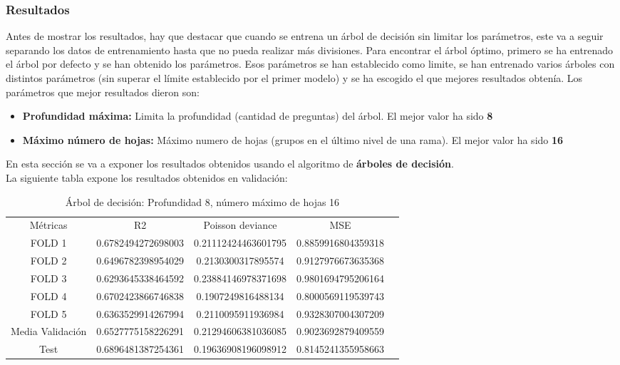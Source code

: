 \subsubsection{Resultados}
\label{sec:res_tree}
Antes de mostrar los resultados, hay que destacar que cuando se entrena un árbol de decisión sin limitar los parámetros, este va a seguir separando los datos de entrenamiento hasta que no pueda realizar más divisiones. Para encontrar el árbol óptimo, primero se ha entrenado el árbol por defecto y se han obtenido los parámetros. Esos parámetros se han establecido como limite, se han entrenado varios árboles con distintos parámetros (sin superar el límite establecido por el primer modelo) y se ha escogido el que mejores resultados obtenía. Los parámetros que mejor resultados dieron son: \\
\begin{itemize}
	\item \textbf{Profundidad máxima:} Limita la profundidad (cantidad de preguntas) del árbol. El mejor valor ha sido \textbf{8}
	\item \textbf{Máximo número de hojas:} Máximo numero de hojas (grupos en el último nivel de una rama). El mejor valor ha sido \textbf{16}
\end{itemize}
En esta sección se va a exponer los resultados obtenidos usando el algoritmo de \textbf{árboles de decisión}.\\
La siguiente tabla expone los resultados obtenidos en validación:
\begin{table}[htbp]
    \begin{tabular}{|c|c|c|c|c}
    \cline{1-4}
    Métricas         & R2                 & Poisson deviance    & MSE                \\ \cline{1-4}
    FOLD 1           & 0.6782494272698003 & 0.21112424463601795 & 0.8859916804359318 \\ \cline{1-4}
    FOLD 2           & 0.6496782398954029 & 0.2130300317895574  & 0.9127976673635368 \\ \cline{1-4}
    FOLD 3           & 0.6293645338464592 & 0.23884146978371698 & 0.9801694795206164 \\ \cline{1-4}
    FOLD 4           & 0.6702423866746838 & 0.1907249816488134  & 0.8000569119539743 \\ \cline{1-4}
    FOLD 5           & 0.6363529914267994 & 0.2110095911936984  & 0.9328307004307209 \\ \cline{1-4}
    Media Validación & 0.6527775158226291 & 0.21294606381036085 & 0.9023692879409559 \\ \cline{1-4}
    Test             & 0.6896481387254361 & 0.19636908196098912 & 0.8145241355958663 \\ \cline{1-4}
    \end{tabular}
	\caption{Árbol de decisión:  Profundidad 8, número máximo de hojas 16}
	\label{tab:tree_res}
\end{table}
